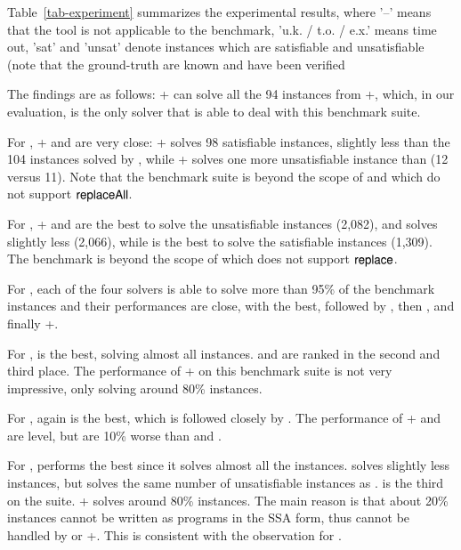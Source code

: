 Table~\ref{tab-experiment} summarizes the experimental results, where '--' means that the tool is not applicable to the benchmark, 'u.k. / t.o. / e.x.' means time out,  'sat' and 'unsat' denote instances which are satisfiable and unsatisfiable (note that the ground-truth are known and have been verified   

The findings are as follows:  {\ostrich}+ can solve all the 94 instances from  {\transducerbench}+, which, in our evaluation, is the only solver that is able to deal with this benchmark suite. 

For  {\slogbenchra}, {\ostrich}+ and {\cvc} are very close: {\ostrich}+ solves 98 satisfiable instances, slightly less than the 104 instances solved by {\cvc}, while {\ostrich}+ solves one more unsatisfiable instance than {\cvc} (12 versus 11). Note that the {\slogbenchra} benchmark suite is beyond the scope of {\zthree} and {\zthreetrau} which do not support $\mathsf{replaceAll}$.

For {\slogbenchr}, {\ostrich}+ and {\cvc} are the best to solve the unsatisfiable instances (2,082), and {\zthree} solves slightly less (2,066),  
while {\cvc} is the best to solve the satisfiable instances (1,309). The {\slogbenchr} benchmark is beyond the scope of {\zthreetrau} which does not support $\mathsf{replace}$.

For {\pyextdbench}, each of the four solvers is able to solve more than 95\% of the benchmark instances and their performances are close, with {\zthreetrau} the best, followed by {\cvc}, then {\zthree}, and finally {\ostrich}+.  

For {\pyexztbench}, {\zthreetrau} is the best, solving almost all instances. %
{\cvc} and {\zthree} are ranked in the second and third place. The performance of {\ostrich}+ on this benchmark suite is not very impressive, only solving around 80\% instances.

For {\pyexzzbench}, %
{\zthreetrau} again is the best, which is followed closely by {\cvc}. %
The performance of {\ostrich}+ and {\zthree} are level, but are 10\% worse than  {\zthreetrau} and {\cvc}. %

For {\kaluzabench}, {\cvc} performs the best since it solves almost all the instances. %
{\zthreetrau} solves slightly less instances, but solves the same number of unsatisfiable instances as {\cvc}. {\zthree} is the third on the {\kaluzabench} suite. 
{\ostrich}+ %
solves  around 80\%  instances. The main reason is that about 20\% {\kaluzabench} instances cannot be written as programs in the SSA form, thus cannot be handled by%
{\ostrich} or {\ostrich}+. This  is consistent with the observation for {\ostrich} \cite{CHL+19} .

